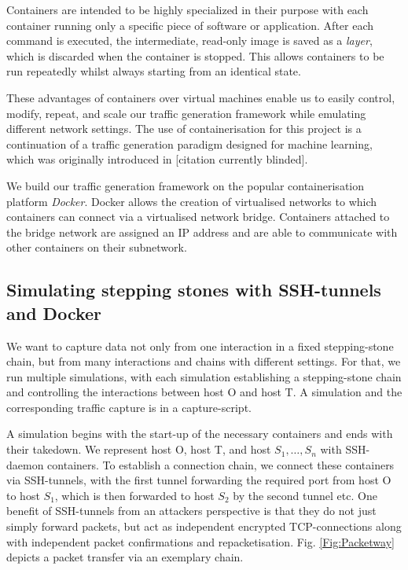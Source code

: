 \documentclass[runningheads]{llncs}\usepackage[]{graphicx}\usepackage[]{color}
\begin{document}
Containers are intended to be highly specialized in their purpose with each container running only a specific piece of software or application. After each command is executed, the intermediate, read-only image is saved as a \textit{layer}, which is discarded when the container is stopped. This allows containers to be run repeatedly whilst always starting from an identical state. 

These advantages of containers over virtual machines enable us to easily control, modify, repeat, and scale our traffic generation framework while emulating different network settings. The use of containerisation for this project is a continuation of a traffic generation paradigm designed for machine learning, which was originally introduced in [citation currently blinded].



We build our traffic generation framework on the popular containerisation platform \textit{Docker}. Docker allows the creation of virtualised networks to which containers can connect via a virtualised network bridge. Containers attached to the bridge network are assigned an IP address and are able to communicate with other containers on their subnetwork.

\subsection{Simulating stepping stones with SSH-tunnels and Docker}\label{Sec:Setup}

We want to capture data not only from one interaction in a fixed stepping-stone chain, but from many interactions and chains with different settings. For that, we run multiple simulations, with each simulation establishing a stepping-stone chain and controlling the interactions between host O and host T. A simulation and the corresponding traffic capture is in a capture-script. 

A simulation begins with the start-up of the necessary containers and ends with their takedown. We represent host O, host T, and host $S_1,\dots,S_n$ with SSH-daemon containers.  To establish a connection chain, we connect these containers via SSH-tunnels, with the first tunnel forwarding the required port from host O to host $S_1$, which is then forwarded to host $S_2$ by the second tunnel etc. One benefit of SSH-tunnels from an attackers perspective is that they do not just simply forward packets, but act as independent encrypted TCP-connections along with independent packet confirmations and repacketisation.  Fig. \ref{Fig:Packetway} depicts a packet transfer via an exemplary chain. 
\end{document}

